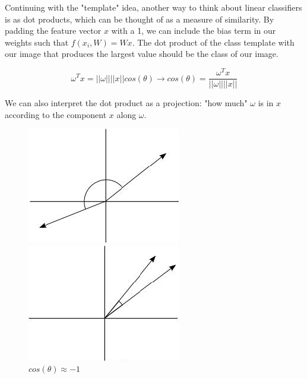 \documentclass[twoside]{article}
\begin{document}
Continuing with the "template" idea, another way to think about linear classifiers is as dot products, which can be thought of as a measure of similarity. By padding the feature vector $x$ with a 1, we can include the bias term in our weights such that $f(x_i,W) = Wx$. The dot product of the class template with our image that produces the largest value should be the class of our image.

$$\omega^Tx = ||\omega||||x||cos(\theta) \rightarrow cos(\theta) = \frac{\omega^Tx}{||\omega||||x||}$$

We can also interpret the dot product as a projection: "how much" $\omega$ is in $x$ according to the component $x$ along $\omega$.
\begin{figure}[H]
  \centering
  \begin{minipage}[b]{0.25\textwidth}
    \includegraphics[width=\textwidth]{pics/lecture_8_dot_prod_-1.jpg}
    \caption*{$cos(\theta) \approx -1$}
  \end{minipage}
  \hfill
  \begin{minipage}[b]{0.25\textwidth}
    \includegraphics[width=\textwidth]{pics/lecture_8_dot_prod_0.jpg}

\end{minipage}
\end{figure}
\end{document}

